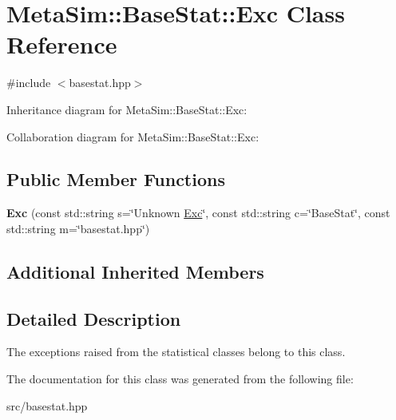 \hypertarget{classMetaSim_1_1BaseStat_1_1Exc}{}\section{Meta\+Sim\+:\+:Base\+Stat\+:\+:Exc Class Reference}
\label{classMetaSim_1_1BaseStat_1_1Exc}


{\ttfamily \#include $<$basestat.\+hpp$>$}



Inheritance diagram for Meta\+Sim\+:\+:Base\+Stat\+:\+:Exc\+:


Collaboration diagram for Meta\+Sim\+:\+:Base\+Stat\+:\+:Exc\+:
\subsection*{Public Member Functions}
\begin{DoxyCompactItemize}
\item 
{\bfseries Exc} (const std\+::string s=\char`\"{}Unknown \hyperlink{classMetaSim_1_1BaseStat_1_1Exc}{Exc}\char`\"{}, const std\+::string c=\char`\"{}Base\+Stat\char`\"{}, const std\+::string m=\char`\"{}basestat.\+hpp\char`\"{})
\end{DoxyCompactItemize}
\subsection*{Additional Inherited Members}


\subsection{Detailed Description}
The exceptions raised from the statistical classes belong to this class. 

The documentation for this class was generated from the following file\+:\begin{DoxyCompactItemize}
\item 
src/basestat.\+hpp\end{DoxyCompactItemize}
